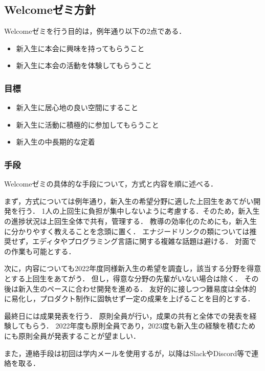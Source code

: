 \subsection*{Welcomeゼミ方針}



Welcomeゼミを行う目的は，例年通り以下の2点である．


\begin{itemize}
    \item 新入生に本会に興味を持ってもらうこと
    \item 新入生に本会の活動を体験してもらうこと
\end{itemize}


\subsubsection*{目標}
\begin{itemize}
    \item 新入生に居心地の良い空間にすること
    \item 新入生に活動に積極的に参加してもらうこと
    \item 新入生の中長期的な定着
\end{itemize}

\subsubsection*{手段}
Welcomeゼミの具体的な手段について，方式と内容を順に述べる．

まず，方式については例年通り，新入生の希望分野に適した上回生をあてがい開発を行う．
1人の上回生に負担が集中しないように考慮する．そのため，新入生の進捗状況は上回生全体で共有，管理する．
教導の効率化のためにも，新入生に分かりやすく教えることを念頭に置く．
エナジードリンクの類については推奨せず，エディタやプログラミング言語に関する複雑な話題は避ける．
対面での作業も可能とする．

次に，内容についても2022年度同様新入生の希望を調査し，該当する分野を得意とする上回生をあてがう．
但し，得意な分野の先輩がいない場合は除く．
その後は新入生のペースに合わせ開発を進める．
友好的に接しつつ難易度は全体的に易化し，プロダクト制作に固執せず一定の成果を上げることを目的とする．

最終日には成果発表を行う．
原則全員が行い，成果の共有と全体での発表を経験してもらう．
2022年度も原則全員であり，2023度も新入生の経験を積むためにも原則全員が発表することが望ましい．

また，連絡手段は初回は学内メールを使用するが，以降はSlackやDiscord等で連絡を取る．
